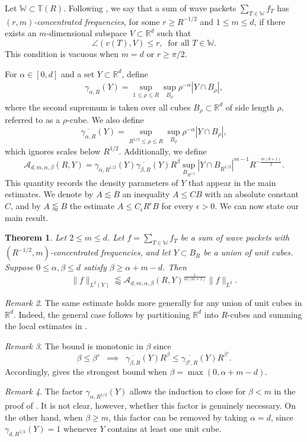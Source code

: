\documentclass[11pt]{amsart}
\newtheorem{theorem}{Theorem}[section]
\theoremstyle{definition}
\theoremstyle{remark}
\newtheorem{remark}[theorem]{Remark}
\numberwithin{equation}{section}
\newcommand{\R}{\mathbb{R}}
\newcommand{\W}{\mathbb{W}}
\newcommand{\T}{\mathbb{T}}
\newcommand{\les}{\lesssim}
\newcommand{\less}{\lessapprox}
\newcommand{\eps}{\epsilon}
\begin{document}
Let $\W \subset \T(R)$. Following \cite{du2023weighted}, we say that a sum of wave packets $\sum_{T\in \W} f_T$  has \emph{$(r,m)$-concentrated frequencies}, for some $r\geq R^{-1/2}$ and $1\leq m\leq d$, if there exists an $m$-dimensional subspace $V\subset \R^d$ such that 
\[ \angle(v(T), V) \leq r,\;\; \text{for all } T \in \W.\]
This condition is vacuous when $m=d$ or  $r\geq \pi/2$.

For $\alpha \in [0,d]$ and a set $Y\subset \R^d$, define
\begin{align*}
	\gamma_{\alpha,R}(Y) =  \sup_{1\leq \rho \leq R} \sup_{B_\rho} \rho^{-\alpha} |Y\cap B_\rho|,
\end{align*}
where the second supremum is taken over all cubes $B_\rho\subset\R^d$ of side
length $\rho$, referred to as a $\rho$-cube. We also define
\[
 \overline{\gamma_{\alpha,R}}(Y) =  \sup_{R^{1/2} \leq \rho \leq R} \sup_{B_\rho} \rho^{-\alpha} |Y\cap B_\rho|,
\]  
which ignores scales below $R^{1/2}$. Additionally, we define 
\[ \mathcal{A}_{d,m,\alpha,\beta}(R, Y) =   \gamma_{\alpha,R^{1/2}}(Y) \overline{\gamma_{\beta,R}}(Y) R^{\beta}  
\sup_{B_{R^{1/2}}} |Y\cap B_{R^{1/2}}|^{m-1}	R^{-\frac{m(d+1)}{2}}. \]
This quantity records the density parameters of $Y$ that appear in the main estimates.
We denote by $A\les B$ an inequality $A\leq CB$ with an absolute constant $C$, and by $A\less B$ the estimate $A\leq C_\eps R^\eps B$ for every $\eps>0$. We can now state our main result.

\begin{theorem}\label{thm:LpWeightedDecouplingConcentrated}
	Let $2\leq m \leq d$. Let $f = \sum_{T \in \W} f_T$ be a sum of wave packets with $(R^{-1/2}, m)$-concentrated frequencies, and let $Y\subset B_R$ be a union of unit cubes.
	Suppose  $0\leq \alpha, \beta \leq d$ satisfy $\beta \geq \alpha +m - d$. 	Then
\[
		\| f \|_{L^2(Y)} \less \mathcal{A}_{d,m,\alpha,\beta}(R,Y)^{\frac{1}{m(m+1)}} 
		\| f \|_{L^2}.
\]
\end{theorem}
\begin{remark}
	The same estimate holds more generally for any union of unit cubes in $\R^d$. Indeed, the general case follows by partitioning	$\R^d$ into $R$-cubes and summing the local estimates in .
\end{remark}
\begin{remark}
	The bound is monotonic in $\beta$ since 
	\[ \beta \leq \beta'  \;\; \implies \;\; \overline{\gamma_{\beta,R}}(Y) R^{\beta}  \leq \overline{\gamma_{\beta',R}}(Y) R^{\beta'}.   \]
 Accordingly,  gives the strongest bound when $\beta = \max(0,\alpha + m - d)$.
\end{remark}
\begin{remark}
	The factor $\gamma_{\alpha,R^{1/2}}(Y)$ allows the induction to close for $\beta<m$ in the proof of . It is
	not clear, however, whether this factor is genuinely necessary.
On the other hand, when $\beta \geq m$, this factor can be  removed by taking $\alpha = d$, since $\gamma_{d,R^{1/2}}(Y) =1$ whenever $Y$ contains at least one unit cube.
\end{remark}
\end{document}
